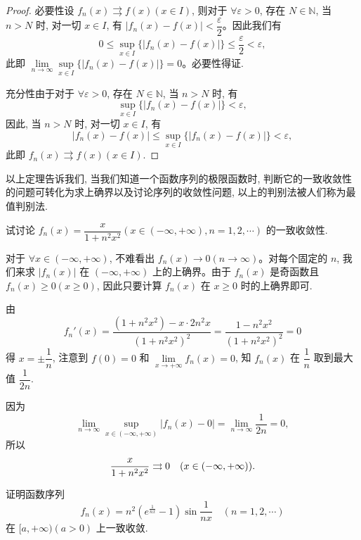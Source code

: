 \begin{proof}
必要性\quad 设 $f_n(x)\rightrightarrows f(x)(x\in I)$, 则对于 $\forall\varepsilon>0$, 存在 $N\in\mathbb N$, 当 $n>N$ 时, 对一切 $x\in I$, 有 $|f_n(x)-f(x)|<\dfrac\varepsilon2$。因此我们有
\[
  0\leq \sup_{x\in I}\{|f_n(x)-f(x)|\}\leq\frac\varepsilon2<\varepsilon,
\]
此即 $\lim\limits_{n\to\infty}\sup\limits_{x\in I}\{|f_n(x)-f(x)|\}=0$。必要性得证.

充分性\quad 由于对于 $\forall\varepsilon>0$, 存在 $N\in\mathbb N$, 当 $n>N$ 时, 有
\[
  \sup_{x\in I}\{|f_n(x)-f(x)|\}<\varepsilon,
\]
因此, 当 $n>N$ 时, 对一切 $x\in I$, 有
\[
  |f_n(x)-f(x)|\leq \sup_{x\in I}\{|f_n(x)-f(x)|\}<\varepsilon,
\]
此即 $f_n(x)\rightrightarrows f(x)(x\in I)$.
\end{proof}


以上定理告诉我们, 当我们知道一个函数序列的极限函数时, 判断它的一致收敛性的问题可转化为求上确界以及讨论序列的收敛性问题, 以上的判别法被人们称为最值判别法.

\begin{example}\label{example:ma-10-3-3}
试讨论 $f_n(x)=\dfrac{x}{1+n^2x^2}(x\in(-\infty,+\infty), n=1,2,\cdots)$ 的一致收敛性.
\end{example}


\begin{solve}
对于 $\forall x\in(-\infty,+\infty)$, 不难看出 $f_n(x)\to0(n\to\infty)$。对每个固定的 $n$, 我们来求 $|f_n(x)|$ 在 $(-\infty,+\infty)$ 上的上确界。由于 $f_n(x)$ 是奇函数且 $f_n(x)\geq0(x\geq0)$, 因此只要计算 $f_n(x)$ 在 $x\geq0$ 时的上确界即可.

由
\[
  f_n'(x)=\frac{(1+n^2x^2)-x\cdot2n^2x}{(1+n^2x^2)^2}
  =\frac{1-n^2x^2}{(1+n^2x^2)^2}=0
\]
得 $x=\pm\dfrac1n$, 注意到 $f(0)=0$ 和 $\lim\limits_{x\to+\infty}f_n(x)=0$, 知 $f_n(x)$ 在 $\dfrac1n$ 取到最大值 $\dfrac1{2n}$.

因为
\[
  \lim_{n\to\infty}\sup_{x\in(-\infty,+\infty)}|f_n(x)-0|
  =\lim_{n\to\infty}\frac1{2n}=0,
\]
所以
\[
  \frac{x}{1+n^2x^2}\rightrightarrows0\quad(x\in(-\infty,+\infty)).
\qedhere
\]
\end{solve}


\begin{example}\label{example:ma-10-3-4}
证明函数序列
\[
  f_n(x)=n^2\left(e^{\frac1{nx}}-1\right)\sin\frac1{nx}\quad(n=1,2,\cdots)
\]
在 $[a,+\infty)(a>0)$ 上一致收敛.
\end{example}


